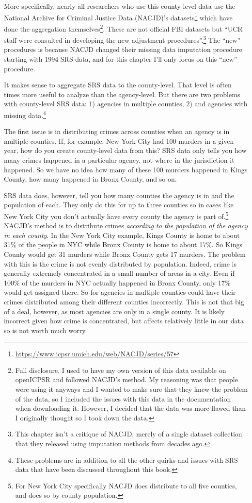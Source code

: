 \documentclass[
]{krantz}
\renewcommand{\href}[2]{#2\footnote{\url{#1}}}
\begin{document}
More specifically, nearly all researchers who use this
county-level data use the National Archive for Criminal
Justice Data (NACJD)'s
\href{https://www.icpsr.umich.edu/web/NACJD/series/57}{datasets}
which have done the aggregation themselves\footnote{Full
  disclosure, I used to have my own version of this data
  available on openICPSR and followed NACJD's method. My
  reasoning was that people were using it anyways and I
  wanted to make sure that they knew the problem of the
  data, so I included the issues with this data in the
  documentation when downloading it. However, I decided that
  the data was more flawed than I originally thought so I
  took down the data.}. These are not official FBI datasets
but ``UCR staff were consulted in developing the new
adjustment procedures''.\footnote{This chapter isn't a
  critique of NACJD, merely of a single dataset collection
  that they released using imputation methods from decades
  ago.} The ``new'' procedures is because NACJD changed
their missing data imputation procedure starting with 1994
SRS data, and for this chapter I'll only focus on this
``new'' procedure.

It makes sense to aggregate SRS data to the county-level.
That level is often times more useful to analyze than the
agency-level. But there are two problems with county-level
SRS data: 1) agencies in multiple counties, 2) and agencies
with missing data.\footnote{These problems are in addition
  to all the other quirks and issues with SRS data that have
  been discussed throughout this book.}

The first issue is in distributing crimes across counties
when an agency is in multiple counties. If, for example, New
York City had 100 murders in a given year, how do you create
county-level data from this? SRS data only tells you how
many crimes happened in a particular agency, not where in
the jurisdiction it happened. So we have no idea how many of
these 100 murders happened in Kings County, how many
happened in Bronx County, and so on.

SRS data does, however, tell you how many counties the
agency is in and the population of each. They only do this
for up to three counties so in cases like New York City you
don't actually have every county the agency is part
of.\footnote{For New York City specifically NACJD does
  distribute to all five counties, and does so by county
  population.} NACJD's method is to distribute crimes
\emph{according to the population of the agency in each
county}. In the New York City example, Kings County is home
to about 31\% of the people in NYC while Bronx County is
home to about 17\%. So Kings County would get 31 murders
while Bronx County gets 17 murders. The problem with this is
the crime is not evenly distributed by population. Indeed,
crime is generally extremely concentrated in a small number
of areas in a city. Even if 100\% of the murders in NYC
actually happened in Bronx County, only 17\% would get
assigned there. So for agencies in multiple counties could
have their crimes distributed among their different counties
incorrectly. This is not that big of a deal, however, as
most agencies are only in a single county. It is likely
incorrect given how crime is concentrated, but affects
relatively little in our data so is not worth much worry.
\end{document}
